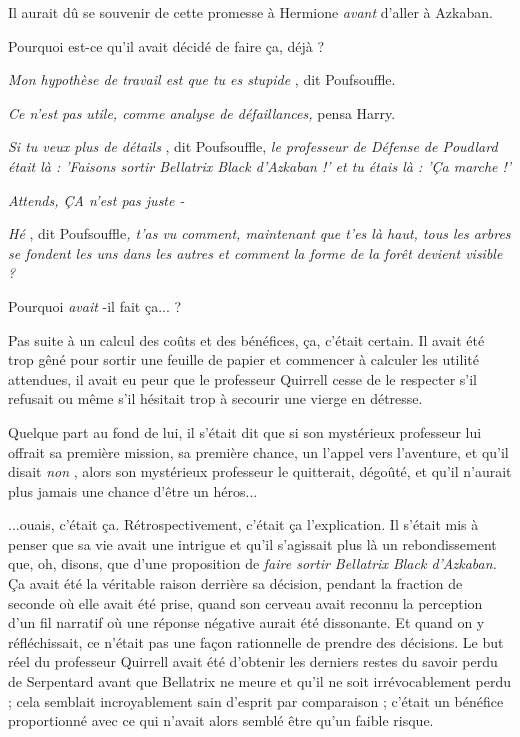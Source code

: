 Il aurait dû se souvenir de cette promesse à Hermione \emph{avant } d'aller à Azkaban.

Pourquoi est-ce qu'il avait décidé de faire ça, déjà ?

\emph{Mon hypothèse de travail est que tu es stupide} , dit Poufsouffle.

\emph{Ce n'est pas utile, comme analyse de défaillances,}  pensa Harry.

\emph{Si tu veux plus de détails} , dit Poufsouffle, \emph{le professeur de Défense de Poudlard était là : 'Faisons sortir Bellatrix Black d'Azkaban !' et tu étais là : 'Ça marche !'} 

\emph{Attends, ÇA n'est pas juste -} 

\emph{Hé} , dit Poufsouffle\emph{, t'as vu comment, maintenant que t'es là haut, tous les arbres se fondent les uns dans les autres et comment la forme de la forêt devient visible ?} 

Pourquoi \emph{avait} -il fait ça... ?

Pas suite à un calcul des coûts et des bénéfices, ça, c'était certain. Il avait été trop gêné pour sortir une feuille de papier et commencer à calculer les utilité attendues, il avait eu peur que le professeur Quirrell cesse de le respecter s'il refusait ou même s'il hésitait trop à secourir une vierge en détresse.

Quelque part au fond de lui, il s'était dit que si son mystérieux professeur lui offrait sa première mission, sa première chance, un l'appel vers l'aventure, et qu'il disait \emph{non} , alors son mystérieux professeur le quitterait, dégoûté, et qu'il n'aurait plus jamais une chance d'être un héros...

...ouais, c'était ça. Rétrospectivement, c'était ça l'explication. Il s'était mis à penser que sa vie avait une intrigue et qu'il s'agissait plus là un rebondissement que, oh, disons, que d'une proposition de \emph{faire sortir Bellatrix Black d'Azkaban.}  Ça avait été la véritable raison derrière sa décision, pendant la fraction de seconde où elle avait été prise, quand son cerveau avait reconnu la perception d'un fil narratif où une réponse négative aurait été dissonante. Et quand on y réfléchissait, ce n'était pas une façon rationnelle de prendre des décisions. Le but réel du professeur Quirrell avait été d'obtenir les derniers restes du savoir perdu de Serpentard avant que Bellatrix ne meure et qu'il ne soit irrévocablement perdu ; cela semblait incroyablement sain d'esprit par comparaison ; c'était un bénéfice proportionné avec ce qui n'avait alors semblé être qu'un faible risque.

